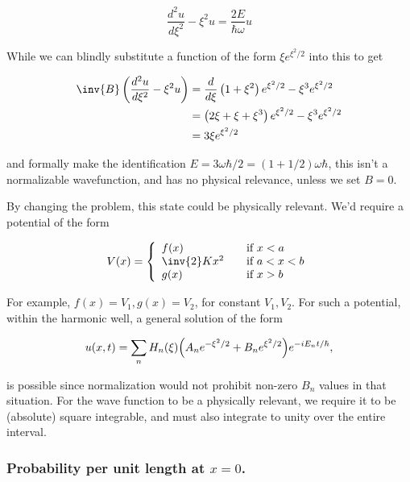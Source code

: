 \begin{equation}\label{eqn:qmIproblemSet5:10}
\frac{d^2 u}{d\xi^2} - \xi^2 u = \frac{2 E }{\hbar\omega} u
\end{equation}

While we can blindly substitute a function of the form $\xi e^{\xi^2/2}$ into this to get

\begin{align*}
\inv{B} \left(\frac{d^2 u}{d\xi^2} - \xi^2 u\right)
&=
\frac{d}{d\xi} \left( 1 + \xi^2 \right) e^{\xi^2/2} - \xi^3 e^{\xi^2/2} \\
&=
\left( 2 \xi + \xi + \xi^3 \right) e^{\xi^2/2} - \xi^3 e^{\xi^2/2} \\
&=
3 \xi e^{\xi^2/2}
\end{align*}

and formally make the identification $E = 3 \omega \hbar/2 = (1 + 1/2) \omega \hbar$, this isn't a normalizable wavefunction, and has no physical relevance, unless we set $B = 0$.

By changing the problem, this state could be physically relevant.  We'd require a potential of the form

\begin{equation}\label{eqn:qmIproblemSet5:11}
V(x) =
\left\{
\begin{array}{l l}
f(x) & \quad \mbox{if $x < a$} \\
\inv{2} K x^2 & \quad \mbox{if $a < x < b$} \\
g(x) & \quad \mbox{if $x > b$} \\
\end{array}
\right.
\end{equation}

For example, $f(x) = V_1, g(x) = V_2$, for constant $V_1, V_2$.  For such a potential, within the harmonic well, a general solution of the form

\begin{equation}\label{eqn:qmIproblemSet5:19}
u(x,t) = \sum_n H_n(\xi) \Bigl(A_n e^{-\xi^2/2} + B_n e^{\xi^2/2} \Bigr) e^{-i E_n t/\hbar},
\end{equation}

is possible since normalization would not prohibit non-zero $B_n$ values in that situation.  For the wave function to be a physically relevant, we require it to be (absolute) square integrable, and must also integrate to unity over the entire interval.

\subsubsection{Probability per unit length at $x=0$.}

